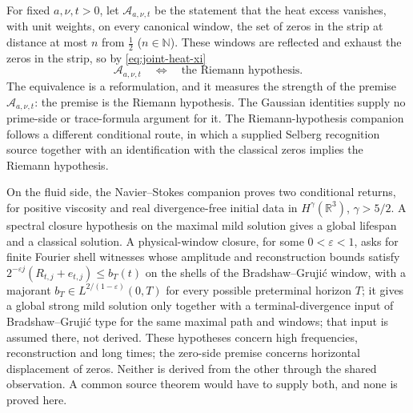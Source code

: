 For fixed \(a,\nu,t>0\), let \(\mathcal A_{a,\nu,t}\) be the statement
that the heat excess vanishes, with unit weights, on every canonical
window, the set of zeros in the strip at distance at most \(n\) from
\(\frac12\) (\(n\in\mathbb N\)).  These windows are reflected and
exhaust the zeros in the strip, so by \eqref{eq:joint-heat-xi}
\[
  \mathcal A_{a,\nu,t}
  \quad\Longleftrightarrow\quad
  \text{the Riemann hypothesis}.
\]
The equivalence is a reformulation, and it measures the strength of the
premise \(\mathcal A_{a,\nu,t}\): the premise is the Riemann hypothesis.
The Gaussian identities supply no prime-side or trace-formula argument
for it.  The Riemann-hypothesis companion \cite{Tsiokos2026RH} follows a
different conditional route, in which a supplied Selberg recognition
source together with an identification with the classical zeros implies
the Riemann hypothesis.

On the fluid side, the Navier--Stokes companion
\cite{Tsiokos2026NavierStokes} proves two conditional returns, for
positive viscosity and real divergence-free initial data in
\(H^\gamma(\mathbb R^3)\), \(\gamma>5/2\).  A spectral closure hypothesis
on the maximal mild solution gives a global lifespan and a classical
solution.  A physical-window closure, for some \(0<\varepsilon<1\), asks for
finite Fourier shell witnesses whose amplitude and reconstruction
bounds satisfy \(2^{-\varepsilon j}(R_{t,j}+e_{t,j})\le b_T(t)\) on the
shells of the Bradshaw--Grujić window, with a majorant
\(b_T\in L^{2/(1-\varepsilon)}(0,T)\) for every possible preterminal
horizon \(T\); it gives a global strong mild solution only
together with a terminal-divergence input of Bradshaw--Grujić type for
the same maximal path and windows; that input is assumed there, not
derived.  These hypotheses concern
high frequencies, reconstruction and long times; the zero-side premise
concerns horizontal displacement of zeros.  Neither is derived from the
other through the shared observation.  A common source theorem would
have to supply both, and none is proved here.
